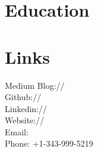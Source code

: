 \documentclass[]{deedy-resume-openfont}
\begin{document}
%
%


%
%

\begin{minipage}[t]{0.25\textwidth}


\section{Education}

\subsection{}
\vspace{1em}
\vspace{1em}
\sectionsep


\section{Links}

Medium Blog:// \href{https://medium.com/@Arafatkatze}{} \\ 
Github:// \href{https://github.com/Arafatkatze}{} \\ 
Linkedin:// \href{https://www.linkedin.com/in/arafat-khan-850616a8/}{} \\ 
Website:// \href{https://arafatkatze.github.io/}{} \\ 
Email: \href{mailto:arafat.da.khan@gmail.com}{} \\
Phone: +1-343-999-5219
\sectionsep





\end{minipage}
\end{document}
